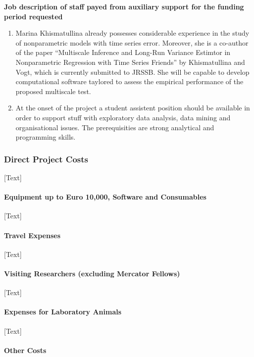 \documentclass[a4paper,12pt]{article}
\begin{document}
{\bf Job description of staff payed from auxiliary support for the funding period requested }

\begin{enumerate}
	\item Marina Khismatullina already possesses considerable experience in the study of nonparametric models with time series error. Moreover, she is a co-author of the paper ``Multiscale Inference and Long-Run Variance Estimtor in Nonparametric Regression with Time Series Friends'' by Khismatullina and Vogt, which is currently submitted to JRSSB. She will be capable to develop computational software taylored to assess the empirical performance of the proposed multiscale test.
	\item At the onset of the project a student assistent position should be available in order to
support stuff with exploratory data analysis, data mining and organisational issues. The
prerequisities are strong analytical and programming skills.
\end{enumerate}

\subsubsection{Direct Project Costs}

[Text]

\paragraph{Equipment up to Euro 10,000, Software and Consumables}

[Text]

\paragraph{Travel Expenses}

[Text]

\paragraph{Visiting Researchers (excluding Mercator Fellows)}

[Text]

\paragraph{Expenses for Laboratory Animals}

[Text]

\paragraph{Other Costs}
\end{document}
